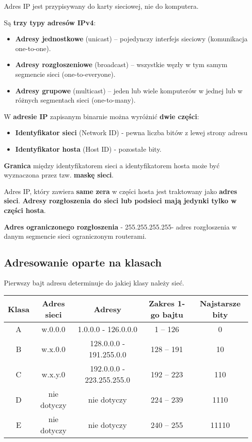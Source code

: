 \documentclass[../main.tex]{subfiles}
\begin{document}
    Adres IP jest przypisywany do karty sieciowej, nie do komputera.

    Są \textbf{trzy typy adresów IPv4}:
    \begin{itemize}
        \item \textbf{Adresy jednostkowe} (unicast) – pojedynczy interfejs sieciowy (komunikacja one-to-one).
        \item \textbf{Adresy rozgłoszeniowe} (broadcast) – wszystkie węzły w tym samym segmencie sieci (one-to-everyone).
        \item \textbf{Adresy grupowe} (multicast) – jeden lub wiele komputerów w jednej lub w różnych segmentach sieci (one-to-many).
    \end{itemize}

    W \textbf{adresie IP} zapisanym binarnie można wyróżnić \textbf{dwie części}:
    \begin{itemize}
        \item \textbf{Identyfikator sieci} (Network ID) - pewna liczba bitów z lewej strony adresu
        \item \textbf{Identyfikator hosta} (Host ID) - pozostałe bity.
    \end{itemize}
    \textbf{Granica} między identyfikatorem sieci a identyfikatorem hosta może być wyznaczona przez
    tzw. \textbf{maskę sieci}.

    Adres IP, który zawiera \textbf{same zera} w części hosta jest traktowany jako \textbf{adres sieci}.
    \textbf{Adresy rozgłoszenia do sieci lub podsieci mają jedynki tylko w części hosta}.

    \textbf{Adres ograniczonego rozgłoszenia} - 255.255.255.255- adres rozgłoszenia
    w danym segmencie sieci ograniczonym routerami.\\

    \subsection{Adresowanie oparte na klasach}

    Pierwszy bajt adresu determinuje do jakiej klasy należy sieć.

    \begin{tabular}{|c|c|c|c|c|}
        \hline
        Klasa & Adres sieci & Adresy & Zakres 1-go bajtu & Najstarsze bity\\
        \hline
        A & w.0.0.0 & 1.0.0.0 - 126.0.0.0 & 1 – 126 & 0\\
        \hline
        B & w.x.0.0 & 128.0.0.0 - 191.255.0.0 & 128 – 191 & 10\\
        \hline
        C & w.x.y.0 & 192.0.0.0 - 223.255.255.0 & 192 – 223 & 110\\
        \hline
        D & nie dotyczy & nie dotyczy & 224 – 239 & 1110\\
        \hline
        E & nie dotyczy & nie dotyczy & 240 – 255 & 11110\\
        \hline
    \end{tabular}
\end{document}
